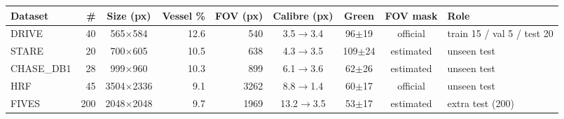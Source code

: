 \begin{tabular}{lrcrrcccl}
\toprule
Dataset & \# & Size (px) & Vessel \% & FOV (px) & Calibre (px) & Green & FOV mask & Role \\
\midrule
DRIVE & 40 & 565$\times$584 & 12.6 & 540 & 3.5$\to$3.4 & 96$\pm$19 & official & train 15 / val 5 / test 20 \\
STARE & 20 & 700$\times$605 & 10.5 & 638 & 4.3$\to$3.5 & 109$\pm$24 & estimated & unseen test \\
CHASE\_DB1 & 28 & 999$\times$960 & 10.3 & 899 & 6.1$\to$3.6 & 62$\pm$26 & estimated & unseen test \\
HRF & 45 & 3504$\times$2336 & 9.1 & 3262 & 8.8$\to$1.4 & 60$\pm$17 & official & unseen test \\
FIVES & 200 & 2048$\times$2048 & 9.7 & 1969 & 13.2$\to$3.5 & 53$\pm$17 & estimated & extra test (200) \\
\bottomrule
\end{tabular}
